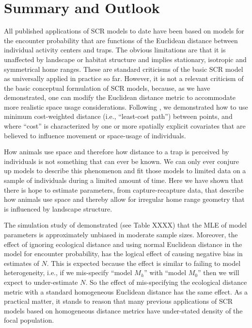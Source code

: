\section{Summary and Outlook}


All published applications of SCR models to date have been based on models for the
encounter probability that are functions of the 
Euclidean
distance between individual activity centers
 and traps. The obvious limitations are
that it is unaffected by landscape or habitat structure and implies
stationary, isotropic and symmetrical home ranges. These are standard
criticisms of the basic SCR model as universally applied in
practice so far. However, it is not a relevant criticism of the basic
conceptual formulation of SCR models, because, as we have
demonstrated, one can modify the Euclidean distance metric to
accommodate more realistic space usage considerations.  Following
\citet{royle_etal:2012ecol},
we demonstrated how to use
minimum cost-weighted distance (i.e., ``least-cost
path'') between points, and where ``cost'' is characterized by one or
more spatially explicit covariates that are believed to influence
movement or space-usage of individuals.

How animals use space and therefore how distance to a trap is
perceived by individuals is not something that can ever be known. We
can only ever conjure up models to describe this phenomenon and fit
those models to limited data on a sample of individuals during a
limited amount of time.  Here we have shown that there is hope to
estimate parameters, from capture-recapture data, that describe how
animals use space and thereby allow for irregular home range geometry
that is influenced by landscape structure.

The  simulation study of \citet{royle_etal:2012ecol} demonstrated
(see Table XXXX) that the MLE of model parameters is
approximately unbiased in moderate sample sizes. Moreover, the effect
of ignoring ecological distance and using normal Euclidean distance in
the model for encounter probability, has the logical effect of causing
negative bias in estimates of $N$.  This is expected because the effect
is similar to failing to model heterogeneity, i.e., if we mis-specify
``model $M_h$'' \citep{otis_etal:1978} with ``model $M_0$''
\citep{otis_etal:1978} then we will expect to under-estimate $N$. So
the effect of mis-specifying the ecological distance metric with a
standard homogeneous Euclidean distance has the same effect. As a
practical matter, it stands to reason that many previous applications
of SCR models based on homogeneous distance metrics have under-stated
density of the focal population.

